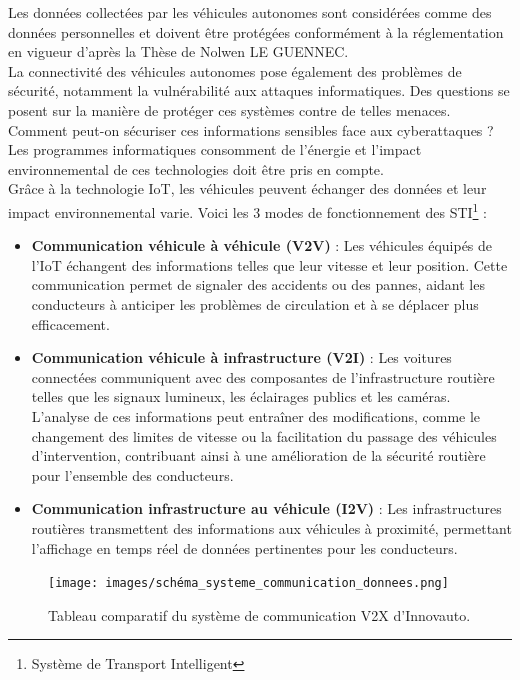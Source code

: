 Les données collectées par les véhicules autonomes sont considérées comme des données personnelles et doivent être protégées conformément à la réglementation en vigueur d'après la Thèse de Nolwen LE GUENNEC\cite{le_gennec_machine_2023}.\\
La connectivité des véhicules autonomes pose également des problèmes de sécurité, notamment la vulnérabilité aux attaques informatiques. Des questions se posent sur la manière de protéger ces systèmes contre de telles menaces. Comment peut-on sécuriser ces informations sensibles face aux cyberattaques ?\\
Les programmes informatiques consomment de l’énergie et l'impact environnemental de ces technologies doit être pris en compte.\\
Grâce à la technologie IoT, les véhicules peuvent échanger des données et leur impact environnemental varie. Voici les 3 modes de fonctionnement des STI\footnote{Système de Transport Intelligent} :
\begin{itemize}
    \item \textbf{Communication véhicule à véhicule (V2V)} : Les véhicules équipés de l’IoT échangent des informations telles que leur vitesse et leur position. Cette communication permet de signaler des accidents ou des pannes, aidant les conducteurs à anticiper les problèmes de circulation et à se déplacer plus efficacement.
    \item \textbf{Communication véhicule à infrastructure (V2I)} : Les voitures connectées communiquent avec des composantes de l'infrastructure routière telles que les signaux lumineux, les éclairages publics et les caméras. L'analyse de ces informations peut entraîner des modifications, comme le changement des limites de vitesse ou la facilitation du passage des véhicules d'intervention, contribuant ainsi à une amélioration de la sécurité routière pour l'ensemble des conducteurs.
    \item \textbf{Communication infrastructure au véhicule (I2V)} : Les infrastructures routières transmettent des informations aux véhicules à proximité, permettant l’affichage en temps réel de données pertinentes pour les conducteurs.
\end{itemize}

\begin{figure}[H]
    \centering
    \texttt{[image: images/schéma\_systeme\_communication\_donnees.png]} 
    \caption{Tableau comparatif du système de communication V2X d'Innovauto.}
\end{figure}

